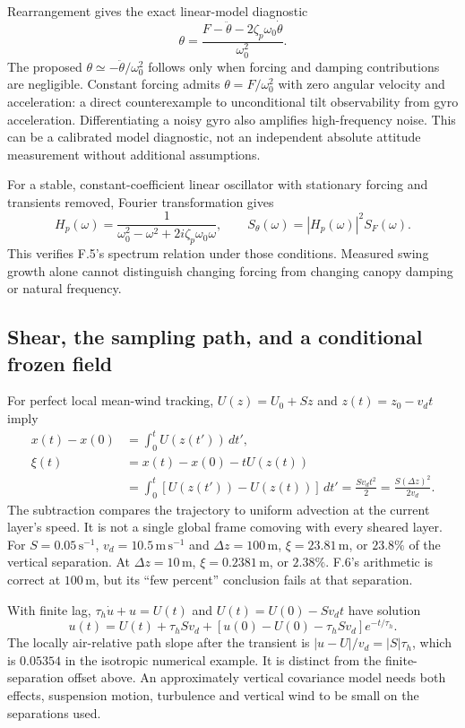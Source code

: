 \documentclass[11pt,a4paper]{article}
\numberwithin{equation}{section}
\begin{document}
Rearrangement gives the exact linear-model diagnostic
\begin{equation}
 \theta=\frac{F-\ddot\theta-2\zeta_p\omega_0\dot\theta}{\omega_0^2}.
\end{equation}
The proposed $\theta\simeq-\ddot\theta/\omega_0^2$ follows only when
forcing and damping contributions are negligible. Constant forcing admits
$\theta=F/\omega_0^2$ with zero angular velocity and acceleration: a
direct counterexample to unconditional tilt observability from gyro
acceleration. Differentiating a noisy gyro also amplifies high-frequency
noise. This can be a calibrated model diagnostic, not an independent
absolute attitude measurement without additional assumptions.

For a stable, constant-coefficient linear oscillator with stationary
forcing and transients removed, Fourier transformation gives
\begin{equation}
 H_p(\omega)=\frac{1}{\omega_0^2-\omega^2+2i\zeta_p\omega_0\omega},
 \qquad S_\theta(\omega)=|H_p(\omega)|^2S_F(\omega).
\end{equation}
This verifies F.5's spectrum relation under those conditions. Measured
swing growth alone cannot distinguish changing forcing from changing
canopy damping or natural frequency.

\subsection{Shear, the sampling path, and a conditional frozen field}

For perfect local mean-wind tracking, $U(z)=U_0+Sz$ and
$z(t)=z_0-v_dt$ imply
\begin{align}
 x(t)-x(0)&=\int_0^tU(z(t'))\,dt',\\
 \xi(t)&=x(t)-x(0)-tU(z(t))\\
 &=\int_0^t[U(z(t'))-U(z(t))]\,dt'
 =\frac{Sv_dt^2}{2}=\frac{S(\Delta z)^2}{2v_d}.
\end{align}
The subtraction compares the trajectory to uniform advection at the
current layer's speed. It is not a single global frame comoving with
every sheared layer. For $S=0.05\,\mathrm{s^{-1}}$, $v_d=10.5\,\mathrm{m\,s^{-1}}$
and $\Delta z=100\,\mathrm m$, $\xi=23.81\,\mathrm m$, or $23.8\%$
of the vertical separation. At $\Delta z=10\,\mathrm m$, $\xi=0.2381\,\mathrm m$,
or $2.38\%$. F.6's arithmetic is correct at $100\,\mathrm m$, but its
``few percent'' conclusion fails at that separation.

With finite lag, $\tau_h\dot u+u=U(t)$ and
$U(t)=U(0)-Sv_dt$ have solution
\begin{equation}
 u(t)=U(t)+\tau_hSv_d+
 [u(0)-U(0)-\tau_hSv_d]e^{-t/\tau_h}.
\end{equation}
The locally air-relative path slope after the transient is
$|u-U|/v_d=|S|\tau_h$, which is $0.05354$ in the isotropic numerical
example. It is distinct from the finite-separation offset above.
An approximately vertical covariance model needs both effects, suspension
motion, turbulence and vertical wind to be small on the separations used.
\end{document}
